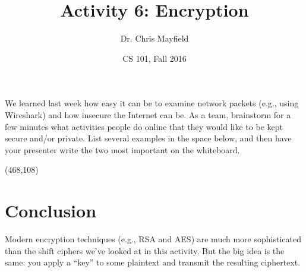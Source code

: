 \documentclass[11pt]{article}
\title{Activity 6: Encryption}
\author{Dr. Chris Mayfield}
\date{CS 101, Fall 2016}
\begin{document}
\maketitle


We learned last week how easy it can be to examine network packets (e.g., using Wireshark) and how insecure the Internet can be.
As a team, brainstorm for a few minutes what activities people do online that they would like to be kept secure and/or private.
List several examples in the space below, and then have your presenter write the two most important on the whiteboard.

\vspace{1em}
\framebox(468,108)





\newpage



\vfill

\section*{Conclusion}

Modern encryption techniques (e.g., RSA and AES) are much more sophisticated than the shift ciphers we've looked at in this activity.
But the big idea is the same: you apply a ``key'' to some plaintext and transmit the resulting ciphertext.
\end{document}
